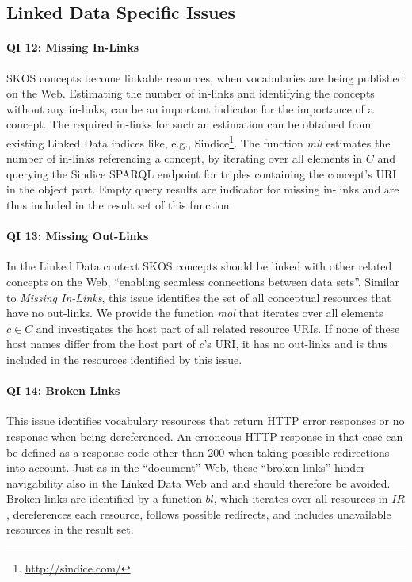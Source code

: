 
\subsection{Linked Data Specific Issues}

\paragraph{QI 12: Missing In-Links}

SKOS concepts become linkable resources, when vocabularies are being published on the Web. Estimating the number of in-links and identifying the concepts without any in-links, can be an important indicator for the importance of a concept. The required in-links for such an estimation can be obtained from existing Linked Data indices like, e.g., Sindice\footnote{\url{http://sindice.com/}}. 
The function \textit{mil} estimates the number of in-links referencing a concept, by iterating over all elements in $C$ and querying the Sindice SPARQL endpoint for triples containing the concept's URI in the object part. Empty query results are indicator for missing  in-links and are thus included in the result set of this function.

\paragraph{QI 13: Missing Out-Links}

In the Linked Data context SKOS concepts should be linked with other related concepts on the Web, ``enabling seamless connections between data sets''\cite{Heath2011}. Similar to \emph{Missing In-Links}, this issue identifies the set of all conceptual resources that have no out-links. 
We provide the function \textit{mol} that iterates over all elements $c \in C$ and investigates the host part of all related resource URIs. If none of these host names differ from the host part of $c$'s URI, it has no out-links and is thus included in the resources identified by this issue.

\paragraph{QI 14: Broken Links}

This issue identifies vocabulary resources that return HTTP error responses or no response when being dereferenced. An erroneous HTTP response in that case can be defined as a response code other than 200 when taking possible redirections into account. Just as in the ``document'' Web, these ``broken links'' hinder navigability also in the Linked Data Web and and should therefore be avoided. 
Broken links are identified by a function $bl$, which iterates over all resources in $IR$, dereferences each resource, follows possible redirects, and includes unavailable resources in the result set.

